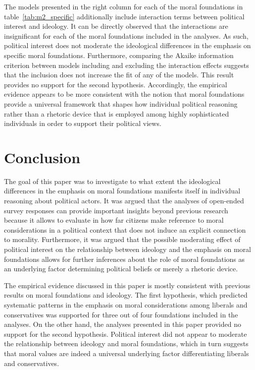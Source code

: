 \documentclass[12pt]{paper}
\begin{document}
The models presented in the right column for each of the moral foundations in table~\ref{tab:m2_specific} additionally include interaction terms between political interest and ideology. It can be directly observed that the interactions are insignificant for each of the moral foundations included in the analyses. As such, political interest does not moderate the ideological differences in the emphasis on specific moral foundations. Furthermore, comparing the Akaike information criterion between models including and excluding the interaction effects suggests that the inclusion does not increase the fit of any of the models. This result provides no support for the second hypothesis. Accordingly, the empirical evidence appears to be more consistent with the notion that moral foundations provide a universal framework that shapes how individual political reasoning rather than a rhetoric device that is employed among highly sophisticated individuals in order to support their political views.


\section{Conclusion}

The goal of this paper was to investigate to what extent the ideological differences in the emphasis on moral foundations manifests itself in individual reasoning about political actors. It was argued that the analyses of open-ended survey responses can provide important insights beyond previous research because it allows to evaluate in how far citizens make reference to moral considerations in a political context that does not induce an explicit connection to morality. Furthermore, it was argued that the possible moderating effect of political interest on the relationship between ideology and the emphasis on moral foundations allows for further inferences about the role of moral foundations as an underlying factor determining political beliefs or merely a rhetoric device.

The empirical evidence discussed in this paper is mostly consistent with previous results on moral foundations and ideology. The first hypothesis, which predicted systematic patterns in the emphasis on moral considerations among liberals and conservatives was supported for three out of four foundations included in the analyses. On the other hand, the analyses presented in this paper provided no support for the second hypothesis. Political interest did not appear to moderate the relationship between ideology and moral foundations, which in turn suggests that moral values are indeed a universal underlying factor differentiating liberals and conservatives.
\end{document}
